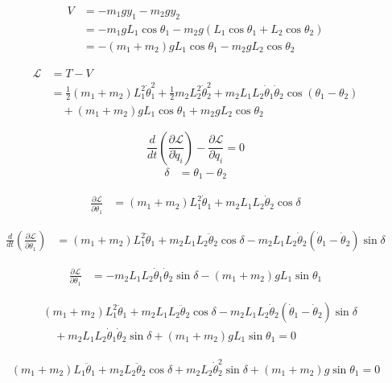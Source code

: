\documentclass[10pt]{article}
\begin{document}
\begin{align*}
V &= -m_1 g y_1 - m_2 g y_2 \\
&= -m_1 g L_1 \cos\theta_1 - m_2 g (L_1 \cos\theta_1 + L_2 \cos\theta_2) \\
&= -(m_1 + m_2) g L_1 \cos\theta_1 - m_2 g L_2 \cos\theta_2
\end{align*}

\begin{align*}
\mathcal{L} &= T - V \\
&= \frac{1}{2}(m_1 + m_2) L_1^2 \dot{\theta}_1^2 + \frac{1}{2} m_2 L_2^2 \dot{\theta}_2^2 + m_2 L_1 L_2 \dot{\theta}_1 \dot{\theta}_2 \cos(\theta_1 - \theta_2) \\
&\quad + (m_1 + m_2) g L_1 \cos\theta_1 + m_2 g L_2 \cos\theta_2
\end{align*}

\[
\frac{d}{dt}\left(\frac{\partial \mathcal{L}}{\partial \dot{q}_i}\right) - \frac{\partial \mathcal{L}}{\partial q_i} = 0
\]
\begin{align*}
\delta &= \theta_1 - \theta_2
\end{align*}

\begin{align*}
\frac{\partial \mathcal{L}}{\partial \dot{\theta}_1} &= (m_1 + m_2) L_1^2 \dot{\theta}_1 + m_2 L_1 L_2 \dot{\theta}_2 \cos\delta
\end{align*}

\begin{align*}
\frac{d}{dt}\left(\frac{\partial \mathcal{L}}{\partial \dot{\theta}_1}\right) &= (m_1 + m_2) L_1^2 \ddot{\theta}_1 + m_2 L_1 L_2 \ddot{\theta}_2 \cos\delta - m_2 L_1 L_2 \dot{\theta}_2 (\dot{\theta}_1 - \dot{\theta}_2) \sin\delta
\end{align*}

\begin{align*}
\frac{\partial \mathcal{L}}{\partial \theta_1} &= -m_2 L_1 L_2 \dot{\theta}_1 \dot{\theta}_2 \sin\delta - (m_1 + m_2) g L_1 \sin\theta_1
\end{align*}

\begin{align*}
&(m_1 + m_2) L_1^2 \ddot{\theta}_1 + m_2 L_1 L_2 \ddot{\theta}_2 \cos\delta - m_2 L_1 L_2 \dot{\theta}_2 (\dot{\theta}_1 - \dot{\theta}_2) \sin\delta \\
&\quad + m_2 L_1 L_2 \dot{\theta}_1 \dot{\theta}_2 \sin\delta + (m_1 + m_2) g L_1 \sin\theta_1 = 0
\end{align*}

\begin{align*}
(m_1 + m_2) L_1 \ddot{\theta}_1 + m_2 L_2 \ddot{\theta}_2 \cos\delta + m_2 L_2 \dot{\theta}_2^2 \sin\delta + (m_1 + m_2) g \sin\theta_1 = 0
\end{align*}
\end{document}
